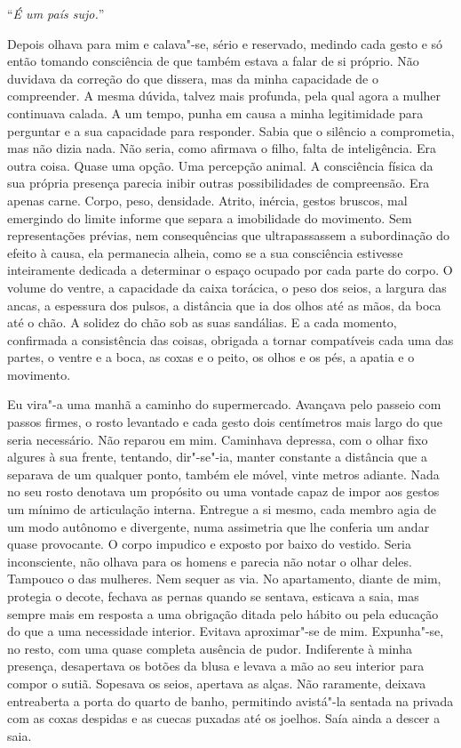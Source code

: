 ``\emph{É um país sujo.}''

Depois olhava para mim e calava"-se, sério e reservado, medindo cada
gesto e só então tomando consciência de que também estava a falar de si
próprio. Não duvidava da correção do que dissera, mas da minha
capacidade de o compreender. A mesma dúvida, talvez mais profunda, pela
qual agora a mulher continuava calada. A um tempo, punha em causa a
minha legitimidade para perguntar e a sua capacidade para responder.
Sabia que o silêncio a comprometia, mas não dizia nada. Não seria, como
afirmava o filho, falta de inteligência. Era outra coisa. Quase uma
opção. Uma percepção animal. A consciência física da sua própria
presença parecia inibir outras possibilidades de compreensão. Era apenas
carne. Corpo, peso, densidade. Atrito, inércia, gestos bruscos, mal
emergindo do limite informe que separa a imobilidade do movimento. Sem
representações prévias, nem consequências que ultrapassassem a
subordinação do efeito à causa, ela permanecia alheia, como se a sua
consciência estivesse inteiramente dedicada a determinar o espaço
ocupado por cada parte do corpo. O volume do ventre, a capacidade da
caixa torácica, o peso dos seios, a largura das ancas, a espessura dos
pulsos, a distância que ia dos olhos até as mãos, da boca até o chão. A
solidez do chão sob as suas sandálias. E a cada momento, confirmada a
consistência das coisas, obrigada a tornar compatíveis cada uma das
partes, o ventre e a boca, as coxas e o peito, os olhos e os pés, a
apatia e o movimento.

Eu vira"-a uma manhã a caminho do supermercado. Avançava pelo passeio
com passos firmes, o rosto levantado e cada gesto dois centímetros mais
largo do que seria necessário. Não reparou em mim. Caminhava depressa,
com o olhar fixo algures à sua frente, tentando, dir"-se"-ia, manter
constante a distância que a separava de um qualquer ponto, também ele
móvel, vinte metros adiante. Nada no seu rosto denotava um propósito ou
uma vontade capaz de impor aos gestos um mínimo de articulação interna.
Entregue a si mesmo, cada membro agia de um modo autônomo e divergente,
numa assimetria que lhe conferia um andar quase provocante. O corpo
impudico e exposto por baixo do vestido. Seria inconsciente, não olhava
para os homens e parecia não notar o olhar deles. Tampouco o das
mulheres. Nem sequer as via. No apartamento, diante de mim, protegia o
decote, fechava as pernas quando se sentava, esticava a saia, mas sempre
mais em resposta a uma obrigação ditada pelo hábito ou pela educação do
que a uma necessidade interior. Evitava aproximar"-se de mim.
Expunha"-se, no resto, com uma quase completa ausência de pudor.
Indiferente à minha presença, desapertava os botões da blusa e levava a
mão ao seu interior para compor o sutiã. Sopesava os seios, apertava as
alças. Não raramente, deixava entreaberta a porta do quarto de banho,
permitindo avistá"-la sentada na privada com as coxas despidas e as
cuecas puxadas até os joelhos. Saía ainda a descer a saia.

